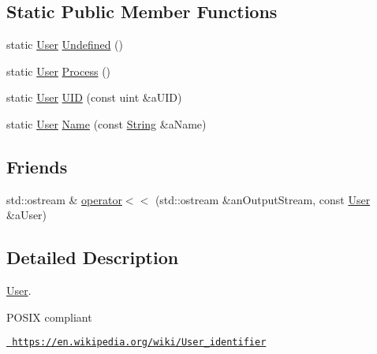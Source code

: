 \subsection*{Static Public Member Functions}
\begin{DoxyCompactItemize}
\item 
static \mbox{\hyperlink{classlibrary_1_1core_1_1system_1_1_user}{User}} \mbox{\hyperlink{classlibrary_1_1core_1_1system_1_1_user_a1195bb2bc30837f9287ea5ed0bfca71b}{Undefined}} ()
\item 
static \mbox{\hyperlink{classlibrary_1_1core_1_1system_1_1_user}{User}} \mbox{\hyperlink{classlibrary_1_1core_1_1system_1_1_user_a15de974c46bff0ff680403edc4ce129d}{Process}} ()
\item 
static \mbox{\hyperlink{classlibrary_1_1core_1_1system_1_1_user}{User}} \mbox{\hyperlink{classlibrary_1_1core_1_1system_1_1_user_a8843d795dde3c3f0b2054b83a7124830}{U\+ID}} (const uint \&a\+U\+ID)
\item 
static \mbox{\hyperlink{classlibrary_1_1core_1_1system_1_1_user}{User}} \mbox{\hyperlink{classlibrary_1_1core_1_1system_1_1_user_a2088b7516e89adf5b6fc9f13e58acc61}{Name}} (const \mbox{\hyperlink{classlibrary_1_1core_1_1types_1_1_string}{String}} \&a\+Name)
\end{DoxyCompactItemize}
\subsection*{Friends}
\begin{DoxyCompactItemize}
\item 
std\+::ostream \& \mbox{\hyperlink{classlibrary_1_1core_1_1system_1_1_user_ac434498b36c6e29a86acbb50589e91a3}{operator$<$$<$}} (std\+::ostream \&an\+Output\+Stream, const \mbox{\hyperlink{classlibrary_1_1core_1_1system_1_1_user}{User}} \&a\+User)
\end{DoxyCompactItemize}


\subsection{Detailed Description}
\mbox{\hyperlink{classlibrary_1_1core_1_1system_1_1_user}{User}}. 

\begin{DoxyVerb}                        POSIX compliant
\end{DoxyVerb}


\href{https://en.wikipedia.org/wiki/User_identifier}{\texttt{ https\+://en.\+wikipedia.\+org/wiki/\+User\+\_\+identifier}} 

